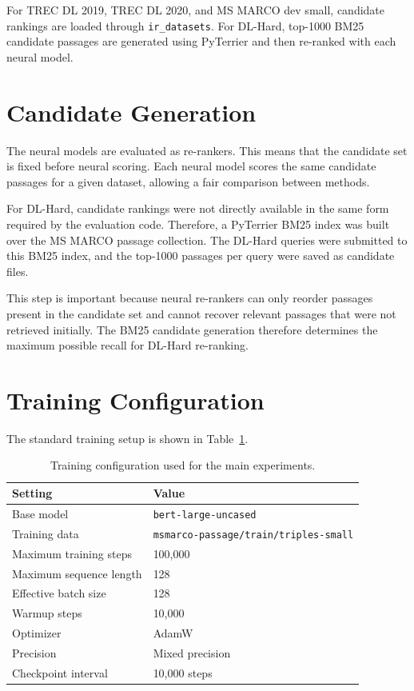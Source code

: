 For TREC DL 2019, TREC DL 2020, and MS MARCO dev small, candidate rankings are loaded through \texttt{ir\_datasets}. For DL-Hard, top-1000 BM25 candidate passages are generated using PyTerrier and then re-ranked with each neural model.

\section{Candidate Generation}
\label{sec:experiments_candidate_generation}

The neural models are evaluated as re-rankers. This means that the candidate set is fixed before neural scoring. Each neural model scores the same candidate passages for a given dataset, allowing a fair comparison between methods.

For DL-Hard, candidate rankings were not directly available in the same form required by the evaluation code. Therefore, a PyTerrier BM25 index was built over the MS MARCO passage collection. The DL-Hard queries were submitted to this BM25 index, and the top-1000 passages per query were saved as candidate files.

This step is important because neural re-rankers can only reorder passages present in the candidate set and cannot recover relevant passages that were not retrieved initially. The BM25 candidate generation therefore determines the maximum possible recall for DL-Hard re-ranking.

\section{Training Configuration}
\label{sec:experiments_training_config}

The standard training setup is shown in Table~\ref{tab:experiments_training_config}.

\begin{table}[ht]
\centering
\begin{tabular}{ll}
\hline
\textbf{Setting} & \textbf{Value} \\
\hline
Base model & \texttt{bert-large-uncased} \\
Training data & \texttt{msmarco-passage/train/triples-small} \\
Maximum training steps & 100,000 \\
Maximum sequence length & 128 \\
Effective batch size & 128 \\
Warmup steps & 10,000 \\
Optimizer & AdamW \\
Precision & Mixed precision \\
Checkpoint interval & 10,000 steps \\
\hline
\end{tabular}
\caption{Training configuration used for the main experiments.}
\label{tab:experiments_training_config}
\end{table}

